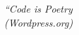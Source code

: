 \begin{epigrafe}
    \vspace*{\fill}
	\begin{flushright}
		\textit{``Code is Poetry\\
		(Wordpress.org)}
	\end{flushright}
\end{epigrafe}